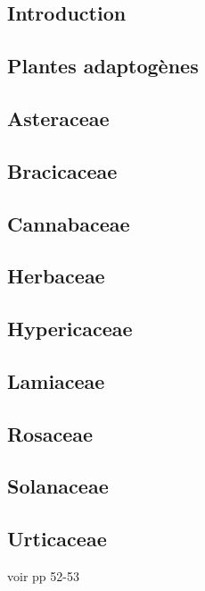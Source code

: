 

\subsection{Introduction}


\subsection{Plantes adaptogènes}


\subsection{Asteraceae}


\subsection{Bracicaceae}


\subsection{Cannabaceae}


\subsection{Herbaceae}


\subsection{Hypericaceae}


\subsection{Lamiaceae}


\subsection{Rosaceae}


\subsection{Solanaceae}


\subsection{Urticaceae}


voir \cite{laporte2023} pp 52-53